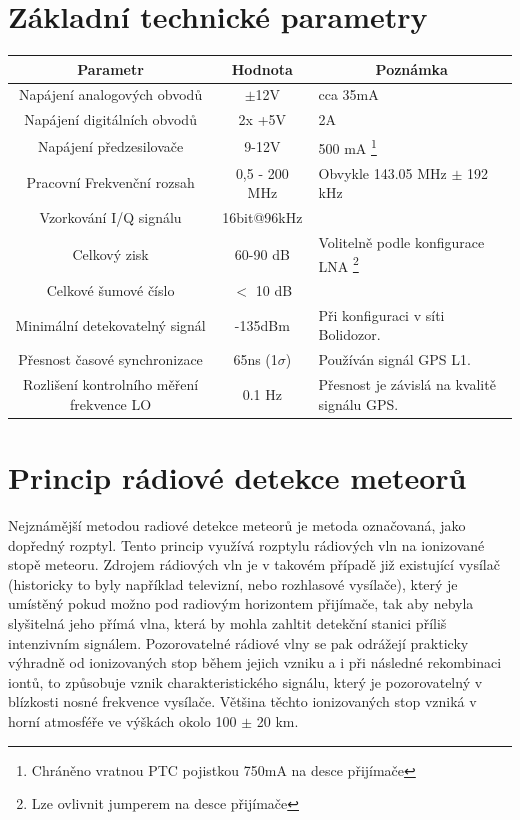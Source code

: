 \documentclass[12pt,a4paper,oneside]{article}
\begin{document}
\section{Základní technické parametry}
\begin{table}[htbp]
\begin{center}
\begin{tabular}{|c|c|p{5cm}|}
\hline
\multicolumn{1}{|c|}{Parametr} & \multicolumn{1}{|c|}{Hodnota} & \multicolumn{1}{|c|}{Poznámka} \\ \hline
Napájení analogových obvodů & $\pm$12V &  cca 35mA \\ \hline
Napájení digitálních obvodů & 2x +5V &  2A \\ \hline
Napájení předzesilovače  & 9-12V &  500 mA \footnote{Chráněno vratnou PTC pojistkou 750mA na desce přijímače} \\ \hline
Pracovní Frekvenční rozsah  & 0,5 - 200 MHz & Obvykle 143.05 MHz $\pm$ 192 kHz \\ \hline
Vzorkování I/Q signálu  & 16bit@96kHz & \\ \hline
Celkový zisk & 60-90 dB & Volitelně podle konfigurace LNA \footnote{Lze ovlivnit jumperem na desce přijímače}\\ \hline
Celkové šumové číslo & $<$ 10 dB & \\ \hline
Minimální detekovatelný signál & -135dBm  &  Při konfiguraci v síti Bolidozor.\\ \hline
Přesnost časové synchronizace &  65ns (1$\sigma$) &  Používán signál GPS L1.\\ \hline
Rozlišení kontrolního měření frekvence LO &  0.1 Hz &  Přesnost je závislá na kvalitě signálu GPS.\\ \hline
\end{tabular}
\end{center}
\end{table}

\newpage

\section{Princip rádiové detekce meteorů}

Nejznámější metodou radiové detekce meteorů je metoda označovaná, jako dopředný rozptyl. Tento princip využívá rozptylu rádiových vln na ionizované stopě meteoru. Zdrojem rádiových vln je v takovém případě již existující vysílač (historicky to byly například televizní, nebo rozhlasové vysílače), který je umístěný pokud možno pod radiovým horizontem přijímače, tak aby nebyla slyšitelná jeho přímá vlna, která by mohla zahltit detekční stanici příliš intenzivním signálem. Pozorovatelné rádiové vlny se pak odrážejí prakticky výhradně od ionizovaných stop během jejich vzniku a i při následné rekombinaci iontů, to způsobuje vznik charakteristického signálu, který je pozorovatelný v blízkosti nosné frekvence vysílače. Většina těchto ionizovaných stop vzniká v horní atmosféře ve výškách okolo 100 $\pm$ 20 km.  
\end{document}
